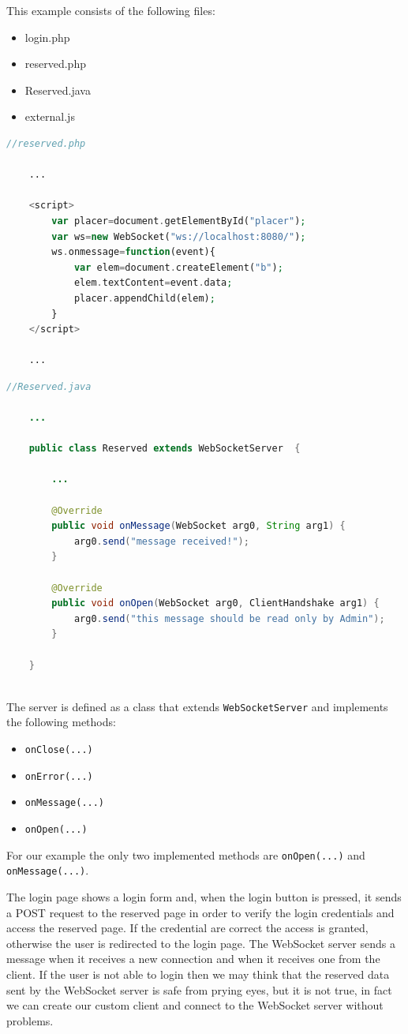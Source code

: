 	This example consists of the following files:
	\begin{itemize}
		\item login.php
		\item reserved.php
		\item Reserved.java
		\item external.js
	\end{itemize}
		
	\begin{lstlisting}[language=php]
	//reserved.php
	
	...
	
	<script>
		var placer=document.getElementById("placer");
		var ws=new WebSocket("ws://localhost:8080/");
		ws.onmessage=function(event){
			var elem=document.createElement("b");
			elem.textContent=event.data;
			placer.appendChild(elem);
		}
	</script>
	
	...

	\end{lstlisting}
	
	\begin{lstlisting}[language=Java]
	//Reserved.java

	...

	public class Reserved extends WebSocketServer  {
		
		...
		
		@Override
		public void onMessage(WebSocket arg0, String arg1) {
			arg0.send("message received!");
		}
		
		@Override
		public void onOpen(WebSocket arg0, ClientHandshake arg1) {
			arg0.send("this message should be read only by Admin");
		}

	}
	
	\end{lstlisting}
	
	The server is defined as a class that extends \texttt{WebSocketServer} and implements the following methods:
	\begin{itemize}
		\item \texttt{onClose(...)}
		\item \texttt{onError(...)}
		\item \texttt{onMessage(...)}
		\item \texttt{onOpen(...)}
	\end{itemize}
	For our example the only two implemented methods are \texttt{onOpen(...)} and \texttt{onMessage(...)}.
	
	The login page shows a login form and, when the login button is pressed, it sends a POST request to the reserved page in order to verify the login credentials and access the reserved page. If the credential are correct the access is granted, otherwise the user is redirected to the login page.\newline
	The WebSocket server sends a message when it receives a new connection and when it receives one from the client.\newline
	If the user is not able to login then we may think that the reserved data sent by the WebSocket server is safe from prying eyes, but it is not true, in fact we can create our custom client and connect to the WebSocket server without problems.\newline
	
